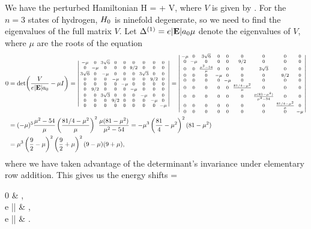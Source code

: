 \begin{solution}
	We have the perturbed Hamiltonian
	\beq
		H = \Ho + \lambda V,
	\eeq
	where $V$ is given by .  For the $n = 3$ states of hydrogen, $H_0$ is ninefold degenerate, so we need to find the eigenvalues of the full matrix $V$.  Let $\Delta^{(1)} = e |\mathbf{E}| a_0 \mu$ denote the eigenvalues of $V$, where $\mu$ are the roots of the equation
	\begin{align*}
		0 &= \det(\frac{V}{e |\vE| \ao} - \mu I)
		= \svmqty{-\mu & 0 & 3 \sqrt{6} & 0 & 0 & 0 & 0 & 0 & 0 \\
			0 & -\mu & 0 & 0 & 0 & 9/2 & 0 & 0 & 0 \\
			3 \sqrt{6} & 0 & -\mu & 0 & 0 & 0 & 3 \sqrt{3} & 0 & 0 \\
			0 & 0 & 0 & -\mu & 0 & 0 & 0 & 9/2 & 0 \\
			0 & 0 & 0 & 0 & -\mu & 0 & 0 & 0 & 0 \\
			0 & 9/2 & 0 & 0 & 0 & -\mu & 0 & 0 & 0 \\
			0 & 0 & 3 \sqrt{3} & 0 & 0 & 0 & -\mu & 0 & 0 \\
			0 & 0 & 0 & 9/2 & 0 & 0 & 0 & -\mu & 0 \\
			0 & 0 & 0 & 0 & 0 & 0 & 0 & 0 & -\mu}
		= \svmqty{-\mu & 0 & 3 \sqrt{6} & 0 & 0 & 0 & 0 & 0 & 0 \\
			0 & -\mu & 0 & 0 & 0 & 9/2 & 0 & 0 & 0 \\
			0 & 0 & \frac{\mu^2 - 54}{\mu} & 0 & 0 & 0 & 3 \sqrt{3} & 0 & 0 \\
			0 & 0 & 0 & -\mu & 0 & 0 & 0 & 9/2 & 0 \\
			0 & 0 & 0 & 0 & -\mu & 0 & 0 & 0 & 0 \\
			0 & 0 & 0 & 0 & 0 & \frac{81/4 - \mu^2}{\mu} & 0 & 0 & 0 \\
			0 & 0 & 0 & 0 & 0 & 0 & \frac{\mu (81 - \mu^2)}{\mu^2 - 54} & 0 & 0 \\
			0 & 0 & 0 & 0 & 0 & 0 & 0 & \frac{81/4 - \mu^2}{\mu} & 0 \\
			0 & 0 & 0 & 0 & 0 & 0 & 0 & 0 & -\mu} \\
			&= (-\mu)^5 \frac{\mu^2 - 54}{\mu} \left( \frac{81/4 - \mu^2}{\mu} \right)^2 \frac{\mu (81 - \mu^2)}{\mu^2 - 54}
			= -\mu^3 \left( \frac{81}{4} - \mu^2 \right)^2 (81 - \mu^2) \\
			&= \mu^3 \left( \frac{9}{2} - \mu \right)^2 \left( \frac{9}{2} + \mu \right)^2 (9 - \mu) (9 + \mu),
	\end{align*}
	where we have taken advantage of the determinant's invariance under elementary row addition.  This gives us the energy shifts
	\beq
		\Del = \begin{cases}
			0 & , \\
			\pm{} e |\vE| \ao & , \\
			 e |\vE| \ao & .
		\end{cases}
	\eeq
\end{solution}